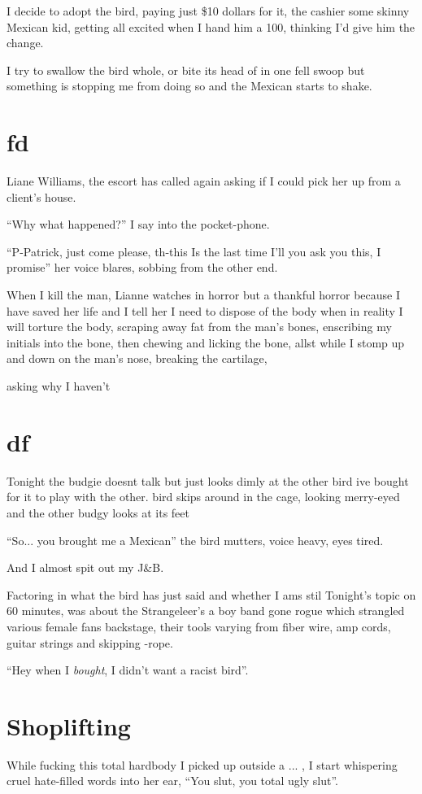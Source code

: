 \documentclass[19pt,openany]{book}
\begin{document}
I decide to adopt the bird, paying just \$10
dollars for it, the cashier some skinny Mexican kid,
getting all excited when I hand him a 100, thinking
I'd give him the change.

I try to swallow the bird whole,
or bite its head of in one fell swoop
but something is stopping me from doing so and the Mexican
starts to shake.
\chapter{fd}
Liane Williams, the escort has called again asking if I could pick her up from a client's house.

``Why what happened?'' I say into the pocket-phone.

``P-Patrick, just come please, th-this Is the last time I'll you ask you this, I promise'' her voice blares,
sobbing from the other end.

When I kill the man, Lianne watches in horror but a thankful horror because I have saved her life and I tell her I need
to dispose of the body when in reality I will torture the body, scraping away fat from the man's bones, enscribing my initials
into the bone, then chewing and licking the bone, allst while I stomp up and down on the man's nose, breaking the cartilage,

asking why I haven't
\chapter{df}
Tonight the budgie doesnt talk but just looks dimly at the other bird ive bought for it to play with
the other. bird skips around in the cage, looking merry-eyed and the other budgy looks at its feet

``So... you brought me a Mexican'' the bird mutters, voice heavy, eyes tired.

And I almost spit out my J\&B.

Factoring in what the bird has just said
and whether I ams stil
Tonight's topic on 60 minutes, was about the Strangeleer's a boy band
gone rogue which strangled various female fans backstage, their tools
varying from fiber wire, amp cords, guitar strings and skipping -rope.

``Hey when I \textit{bought}, I didn't want a racist bird''.
\chapter{Shoplifting}
While fucking this total hardbody I picked up outside a ...
, I start whispering cruel hate-filled words
into her ear, ``You slut, you total ugly slut''.
\end{document}
